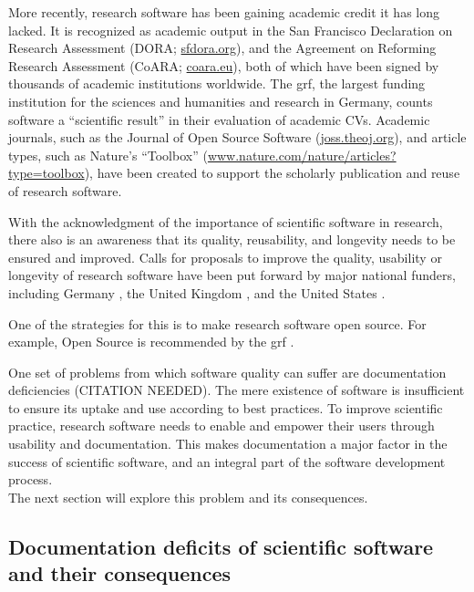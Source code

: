 More recently, research software has been gaining academic credit it has long lacked.
It is recognized as academic output in the San Francisco Declaration on Research Assessment (DORA; \href{https://sfdora.org/}{sfdora.org}), and the Agreement on Reforming Research Assessment (CoARA; \href{https://coara.eu}{coara.eu}), both of which have been signed by thousands of academic institutions worldwide. The \gls{grf}, the largest funding institution for the sciences and humanities and research in Germany, counts software a ``scientific result'' in their evaluation of academic CVs.
Academic journals, such as the Journal of Open Source Software (\href{https://joss.theoj.org/}{joss.theoj.org}), and article types, such as Nature's ``Toolbox'' (\href{https://www.nature.com/nature/articles?type=toolbox}{www.nature.com/nature/articles?type=toolbox}), have been created to support the scholarly publication and reuse of research software.

With the acknowledgment of the importance of scientific software in research, there also is an awareness that its quality, reusability, and longevity needs to be ensured and improved.
Calls for proposals to improve the quality, usability or longevity of research software have been put forward by major national funders, including Germany \citep{dfgrs}, the United Kingdom \citep{ukri}, and the United States \citep{nih}.

One of the strategies for this is to make research software open source.
For example, Open Source is recommended by the \gls{grf} \citep{dfg}.

One set of problems from which software quality can suffer are documentation deficiencies (CITATION NEEDED).
The mere existence of software is insufficient to ensure its uptake and use according to best practices.
To improve scientific practice, research software needs to enable and empower their users through usability and documentation.
This makes documentation a major factor in the success of scientific software, and an integral part of the software development process.\\
The next section will explore this problem and its consequences.


\subsection{Documentation deficits of scientific software and their consequences}


